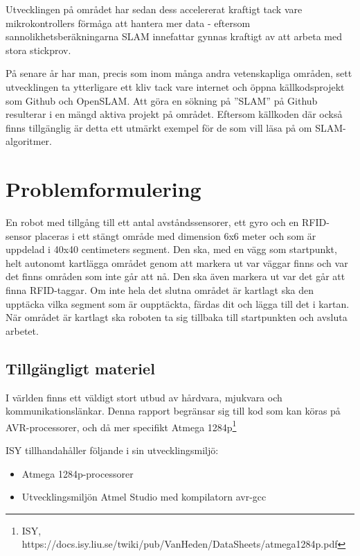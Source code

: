 \documentclass[a4paper,12pt,fleqn]{article}
\begin{document}
Utvecklingen på området har sedan dess accelererat kraftigt tack vare
mikrokontrollers förmåga att hantera mer data - eftersom
sannolikhetsberäkningarna SLAM innefattar gynnas kraftigt av att arbeta
med stora stickprov.

På senare år har man, precis som inom många andra vetenskapliga områden, sett utvecklingen ta ytterligare ett kliv tack vare internet och öppna källkodsprojekt som Github och OpenSLAM. Att göra en sökning på ''SLAM'' på Github resulterar i en mängd aktiva projekt på området. Eftersom källkoden där också finns tillgänglig är detta ett utmärkt exempel för de som vill läsa på om SLAM-algoritmer. 


\section{Problemformulering}

En robot med tillgång till ett antal avståndssensorer, ett gyro och en RFID-sensor placeras i ett stängt område med dimension 6x6 meter och som är uppdelad i 40x40 centimeters segment. Den ska, med en vägg som startpunkt, helt autonomt kartlägga området genom att markera ut var väggar finns och var det finns områden som inte går att nå. Den ska även markera ut var det går att finna RFID-taggar. Om inte hela det slutna området är kartlagt ska den upptäcka vilka segment som är oupptäckta, färdas dit och lägga till det i kartan. När området är kartlagt ska roboten ta sig tillbaka till startpunkten och avsluta arbetet. 

\subsection{Tillgängligt materiel}

I världen finns ett väldigt stort utbud av hårdvara, mjukvara och kommunikationslänkar. Denna rapport begränsar sig till kod som kan köras på AVR-processorer, och då mer specifikt Atmega 1284p\footnote{ISY, https://docs.isy.liu.se/twiki/pub/VanHeden/DataSheets/atmega1284p.pdf}

ISY tillhandahåller följande i sin utvecklingsmiljö: 
\begin{itemize}
	\item Atmega 1284p-processorer
	\item Utvecklingsmiljön Atmel Studio med kompilatorn avr-gcc
\end{itemize}
\end{document}
